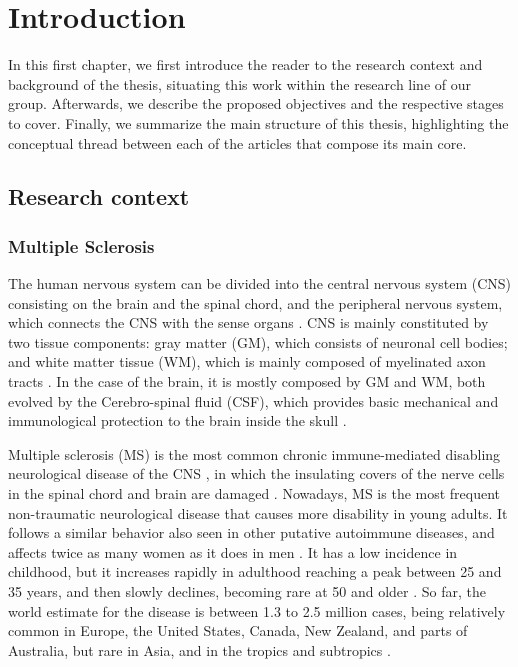 \chapter{Introduction}


In this first chapter, we first introduce the reader to the research context and background of the thesis, situating this work within the research line of our group. Afterwards, we describe the proposed objectives and the respective stages to cover. Finally, we summarize the main structure of this thesis, highlighting the conceptual thread between each of the articles that compose its main core. 

\section{Research context}
\label{sec:introduction_research_context}

\subsection{Multiple Sclerosis}
\label{sub:introduction_multiple_sclerosis}

The human nervous system can be divided into the central nervous system (CNS) consisting on the brain and the spinal chord, and the peripheral nervous system, which connects the CNS with the sense organs \cite{Brodal2010}. CNS is mainly constituted by two tissue components: gray matter (GM), which consists of neuronal cell bodies; and white matter tissue (WM), which is mainly composed of myelinated axon tracts \cite{Sperber2006}. In the case of the brain,  it is mostly composed by GM and WM, both evolved by the Cerebro-spinal fluid (CSF), which provides basic mechanical and immunological protection to the brain inside the skull \cite{Sperber2006}. 

Multiple sclerosis (MS) is the most common chronic immune-mediated disabling neurological disease of the CNS \cite{Steinman1996}, in which the insulating covers of the nerve cells in the spinal chord and brain are damaged \cite{Compston2008}. Nowadays, MS is the most frequent non-traumatic neurological disease that causes more disability in young adults. It follows a similar behavior also seen in other putative autoimmune diseases, and affects twice as many women as it does in men \cite{Confavreux1980}. It has a low incidence in childhood, but it increases rapidly in adulthood reaching a peak between 25 and 35 years, and then slowly declines, becoming rare at 50 and older \cite{Cabezas2011}. So far, the world estimate for the disease is between 1.3 to 2.5 million cases, being relatively common in Europe, the United States, Canada, New Zealand, and parts of Australia, but rare in Asia, and in the tropics and subtropics \cite{Cabezas2011}. 

